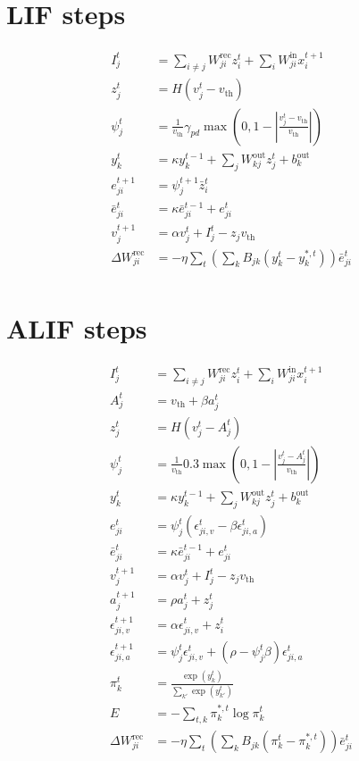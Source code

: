 \documentclass{article}
\begin{document}
\section{LIF steps}
\begin{align}
I^t_j &= \sum_{i\neq j} W^\text{rec}_{ji} z_i^t + \sum_i W^\text{in}_{ji}x_i^{t+1} \\
z^t_j &= H\left(v_j^t-v_\text{th}\right)\\
\psi^t_j &= \frac{1}{v_\text{th}}\gamma_{pd}\max\left(0, 1-\left|\frac{v_j^t-v_\text{th}}{v_\text{th}}\right|\right)\\
y^t_k &= \kappa y^{t-1}_k + \sum_j W^\text{out}_{kj}z^t_j+b^\text{out}_k\\
e^{t+1}_{ji} &= \psi^{t+1}_j\bar{z}^t_i\\
\bar{e}^t_{ji} &= \kappa\bar{e}^{t-1}_{ji} + e^t_{ji}\\
v^{t+1}_j &= \alpha v_j^t + I_j^t-z_jv_\text{th}\\
\Delta W^\text{rec}_{ji} &= -\eta\sum_t\left(\sum_kB_{jk}\left(y_k^t-y_k^{*,t}\right)\right)\bar{e}^t_{ji}\\
\end{align}
\section{ALIF steps}
\begin{align}
I^t_j &= \sum_{i\neq j} W^\text{rec}_{ji} z_i^t + \sum_i W^\text{in}_{ji}x_i^{t+1} \\
A^t_j &= v_\text{th}+\beta a^t_j\\
z^t_j &= H\left(v_j^t-A_j^t\right)\\
\psi^t_j &= \frac{1}{v_\text{th}}0.3\max\left(0, 1-\left|\frac{v_j^t-A^t_j}{v_\text{th}}\right|\right)\\
y^t_k &= \kappa y^{t-1}_k + \sum_j W^\text{out}_{kj}z^t_j+b^\text{out}_k\\
e^t_{ji} &= \psi^t_j\left(\epsilon^t_{ji,v} - \beta\epsilon^t_{ji,a}\right)\\
\bar{e}^t_{ji} &= \kappa\bar{e}^{t-1}_{ji} + e^t_{ji}\\
v^{t+1}_j &= \alpha v_j^t + I_j^t-z_jv_\text{th}\\
a^{t+1}_j &= \rho a_j^t + z_j^t\\
\epsilon_{ji,v}^{t+1} &= \alpha\epsilon_{ji,v}^t + z_i^t\\
\epsilon_{ji,a}^{t+1} &= \psi^t_j\epsilon^t_{ji,v} + \left(\rho-\psi^t_j\beta\right)\epsilon^t_{ji,a}\\
\pi_k^t &= \frac{\exp\left(y_k^t\right)}{\sum_{k'}\exp\left( y^t_{k'}\right)}\\
E &= -\sum_{t,k}\pi_k^{*,t}\log\pi_k^t\\
\Delta W^\text{rec}_{ji} &= -\eta\sum_t\left(\sum_kB_{jk}\left(\pi_k^t-\pi_k^{*,t}\right)\right)\bar{e}^t_{ji}\\
\end{align}
\end{document}
